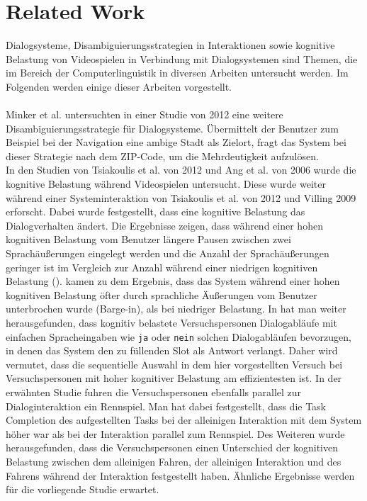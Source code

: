 \documentclass[12pt,a4paper]{scrartcl}
\begin{document}
\newpage
\section{Related Work}

Dialogsysteme, Disambiguierungsstrategien in Interaktionen sowie kognitive Belastung von Videospielen in Verbindung mit Dialogsystemen sind Themen, die im Bereich der Computerlinguistik in diversen Arbeiten untersucht werden. Im Folgenden werden einige dieser Arbeiten vorgestellt. \\
\\
Minker et al. untersuchten in einer Studie von 2012 eine weitere Disambiguierungsstrategie für Dialogsysteme. Übermittelt der Benutzer zum Beispiel bei der Navigation eine ambige Stadt als Zielort, fragt das System bei dieser Strategie nach dem ZIP-Code, um die Mehrdeutigkeit aufzulösen. \\
In den Studien von Tsiakoulis et al. von 2012 und Ang et al. von 2006 wurde die kognitive Belastung während Videospielen untersucht. Diese wurde weiter während einer Systeminteraktion von Tsiakoulis et al. von 2012 und Villing 2009 erforscht. Dabei wurde festgestellt, dass eine kognitive Belastung das Dialogverhalten ändert. Die Ergebnisse zeigen, dass während einer hohen kognitiven Belastung vom Benutzer längere Pausen zwischen zwei Sprachäußerungen eingelegt werden und die Anzahl der Sprachäußerungen geringer ist im Vergleich zur Anzahl während einer niedrigen kognitiven Belastung (\cite{DbCL}).
\cite{eCLDS} kamen zu dem Ergebnis, dass das System während einer hohen kognitiven Belastung öfter durch sprachliche Äußerungen vom Benutzer unterbrochen wurde (Barge-in), als bei niedriger Belastung.
In \cite{eCLDS} hat man weiter herausgefunden, dass kognitiv belastete Versuchspersonen Dialogabläufe mit einfachen Spracheingaben wie \texttt{ja} oder \texttt{nein} solchen Dialogabläufen bevorzugen, in denen das System den zu füllenden Slot als Antwort verlangt. Daher wird vermutet, dass die sequentielle Auswahl in dem hier vorgestellten Versuch bei Versuchspersonen mit hoher kognitiver Belastung am effizientesten ist.  In der erwähnten Studie fuhren die Versuchspersonen ebenfalls parallel zur Dialoginteraktion ein Rennspiel. Man hat dabei festgestellt, dass die Task Completion des aufgestellten Tasks bei der alleinigen Interaktion mit dem System höher war als bei der Interaktion parallel zum Rennspiel. Des Weiteren wurde herausgefunden, dass die Versuchspersonen einen Unterschied der kognitiven Belastung zwischen dem alleinigen Fahren, der alleinigen Interaktion und des Fahrens während der Interaktion festgestellt haben. Ähnliche Ergebnisse werden für die vorliegende Studie erwartet. \\
\end{document}
